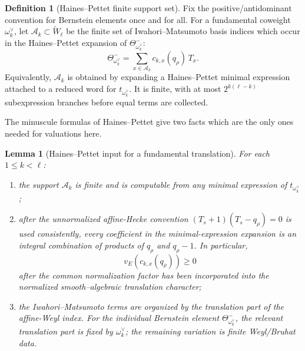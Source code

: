 \documentclass[12pt]{article}
\newtheorem{lemma}[theorem]{Lemma}
\theoremstyle{definition}
\newtheorem{definition}[theorem]{Definition}
\theoremstyle{remark}
\begin{document}
\begin{definition}[Haines--Pettet finite support set]
\label{def:Haines-Pettet-finite-support}
Fix the positive/antidominant convention for Bernstein elements once and for
all.  For a fundamental coweight \(\omega_k^\vee\), let
\(\mathcal A_k\subset\widetilde W_\ell\) be the finite set of
Iwahori--Matsumoto basis indices which occur in the Haines--Pettet expansion
of \(\Theta^-_{\omega_k^\vee}\):
\begin{equation}\label{eq:HP-fundamental-expansion}
 \Theta^-_{\omega_k^\vee}
 =
 \sum_{x\in\mathcal A_k}
 c_{k,x}(q_\rho)\,T_x.
\end{equation}
Equivalently, \(\mathcal A_k\) is obtained by expanding a Haines--Pettet
minimal expression attached to a reduced word for
\(t_{\omega_k^\vee}\).  It is finite, with at most
\(2^{k(\ell-k)}\) subexpression branches before equal terms are collected.
\end{definition}

The minuscule formulas of Haines--Pettet give two facts which are the only
ones needed for valuations here.

\begin{lemma}[Haines--Pettet input for a fundamental translation]
\label{lem:HP-minuscule-input}
For each \(1\leq k<\ell\):
\begin{enumerate}
 \item the support \(\mathcal A_k\) is finite and is computable from any
 minimal expression of \(t_{\omega_k^\vee}\);
 \item after the unnormalized affine-Hecke convention
 \((T_s+1)(T_s-q_\rho)=0\) is used consistently, every coefficient in the
 minimal-expression expansion is an integral combination of products of
 \(q_\rho\) and \(q_\rho-1\).  In particular,
 \begin{equation}\label{eq:HP-coefficient-integrality}
  v_E(c_{k,x}(q_\rho))\geq0
 \end{equation}
 after the common normalization factor has been incorporated into the
 normalized smooth--algebraic translation character;
 \item the Iwahori--Matsumoto terms are organized by the translation part of
 the affine-Weyl index.  For the individual Bernstein element
 \(\Theta^-_{\omega_k^\vee}\), the relevant translation part is fixed by
 \(\omega_k^\vee\); the remaining variation is finite Weyl/Bruhat data.
\end{enumerate}
\end{lemma}
\end{document}
